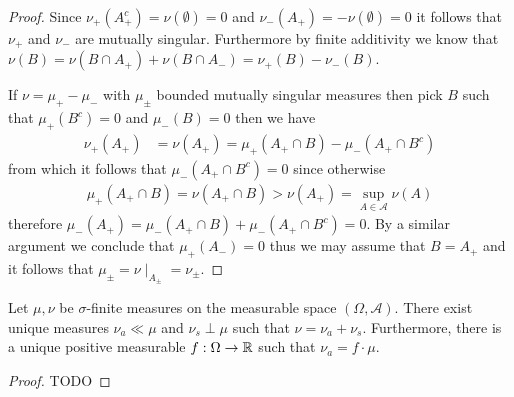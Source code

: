 \begin{proof}
Since $\nu_+(A_+^c) = \nu(\emptyset) = 0$ and $\nu_-(A_+) = -\nu ( \emptyset ) = 0$ it follows that $\nu_+$ and $\nu_-$ are mutually singular.  Furthermore by finite additivity we know that $\nu(B) = \nu(B \cap A_+) + \nu(B \cap A_-) = \nu_+(B) - \nu_-(B)$.

If $\nu = \mu_+ - \mu_-$ with $\mu_\pm$ bounded mutually singular measures then pick $B$ such that $\mu_+(B^c) = 0$ and $\mu_-(B) = 0$ then we have
\begin{align*}
\nu_+(A_+) &= \nu(A_+) = \mu_+(A_+ \cap B) - \mu_-(A_+ \cap B^c)
\end{align*}
from which it follows that $\mu_-(A_+ \cap B^c)=0$ since otherwise 
\begin{align*}
\mu_+(A_+ \cap B) = \nu(A_+ \cap B) > \nu(A_+) = \sup_{A \in \mathcal{A}} \nu(A)
\end{align*}
therefore $\mu_-(A_+) = \mu_-(A_+ \cap B) + \mu_-(A_+\cap B^c) = 0$.  By a similar argument we conclude that $\mu_+(A_-) = 0$ thus we may assume that $B=A_+$ and it follows that $\mu_\pm = \nu \mid_{A_\pm} = \nu_\pm$.
\end{proof}

\begin{thm}\label{RadonNikodym}Let $\mu, \nu$
  be $\sigma$-finite measures on the measurable space $(\Omega,
  \mathcal{A})$.  There exist unique measures $\nu_a \ll \mu$ and
  $\nu_s \perp \mu$ such that $\nu = \nu_a + \nu_s$.  Furthermore,
  there is a unique positive measurable $f : \Omega \to \mathbb{R}$ such
  that $\nu_a = f \cdot \mu$.
\end{thm}
\begin{proof}TODO
\end{proof}

